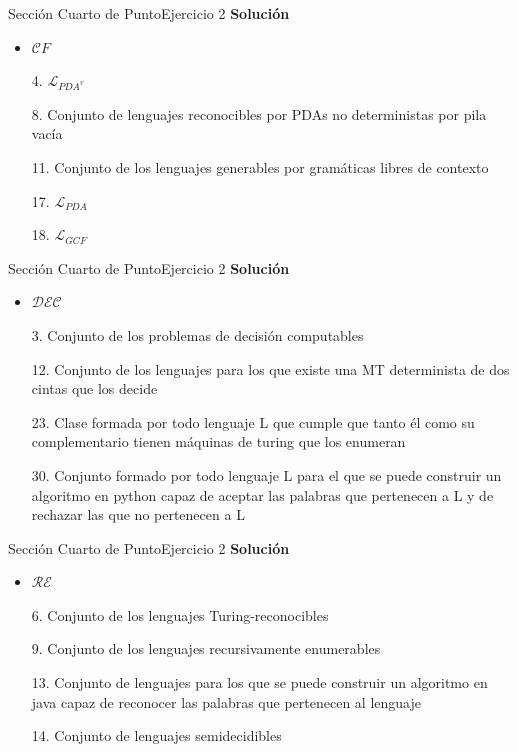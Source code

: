 \documentclass[10pt, envcountsect, presentation, aspectratio=169]{beamer}
\newcommand{\lcf}{\ensuremath{\mathcal CF}}
\newcommand{\lpda}{\ensuremath{\mathcal L_{PDA}}}
\newcommand{\lpdav}{\ensuremath{\mathcal L_{PDA^v}}}
\newcommand{\lgr}{\ensuremath{\mathcal L_{GCF}}}
\newcommand{\ld}{\ensuremath{\mathcal {DEC}}}
\newcommand{\lr}{\ensuremath{\mathcal {RE}}}
\begin{document}

\begin{frame}{Sección Cuarto de Punto}{Ejercicio 2}
    \textbf{Solución}\\
    \begin{itemize}
        \item $\lcf$
        \item[4.] $\lpdav$ 
        \item[8.] Conjunto de lenguajes reconocibles por PDAs no deterministas por pila vacía
        \item[11.] Conjunto de los lenguajes generables por gramáticas libres de contexto
        \item[17.] $\lpda$
        \item[18.] $\lgr$
    \end{itemize}
\end{frame}


\begin{frame}{Sección Cuarto de Punto}{Ejercicio 2}
    \textbf{Solución}\\
    \begin{itemize}
        \item $\ld$
        \item[3.] Conjunto de los problemas de decisión computables
        \item[12.] Conjunto de los lenguajes para los que existe una MT determinista de dos cintas que los decide
        \item[23.] Clase formada por todo lenguaje L que cumple que tanto él como su complementario tienen máquinas de turing que los enumeran
        \item[30.] Conjunto formado por todo lenguaje L para el que se puede construir un algoritmo en python capaz de aceptar las palabras que pertenecen a L y de rechazar las que no pertenecen a L
    \end{itemize}
\end{frame}


\begin{frame}{Sección Cuarto de Punto}{Ejercicio 2}
    \textbf{Solución}\\
    \begin{itemize}
        \item $\lr$
        \item[6.] Conjunto de los lenguajes Turing-reconocibles
        \item[9.] Conjunto de los lenguajes recursivamente enumerables
        \item[13.] Conjunto de lenguajes para los que se puede construir un algoritmo en java capaz de reconocer las palabras que pertenecen al lenguaje
        \item[14.] Conjunto de lenguajes semidecidibles
    \end{itemize}
\end{frame}
\end{document}
